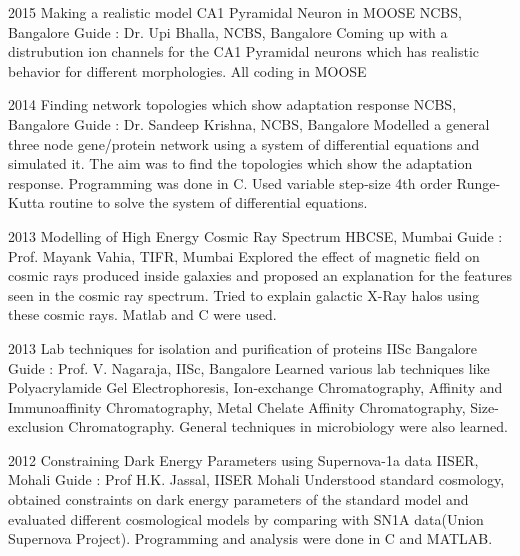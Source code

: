 \documentclass[11pt]{friggeri-cv}%
\begin{document}
\begin{entrylist}
  \entry
    {2015}
    {Making a realistic model CA1 Pyramidal Neuron in MOOSE}
    {NCBS, Bangalore}
    {Guide : Dr. Upi Bhalla, NCBS, Bangalore}
    {Coming up with a distrubution ion channels for the CA1 Pyramidal neurons which has realistic behavior for different morphologies. All coding in MOOSE}
\end{entrylist}
\begin{entrylist}
  \entry
    {2014}
    {Finding network topologies which show adaptation response}
    {NCBS, Bangalore}
    {Guide : Dr. Sandeep Krishna, NCBS, Bangalore}
    {Modelled a general three node gene/protein network using a system of differential equations and simulated it. The aim was to find the topologies which show the adaptation response. Programming was done in C. Used variable step-size 4th order Runge-Kutta routine to solve the system of differential equations.}
\end{entrylist}
\begin{entrylist}

  \entry
    {2013}
    {Modelling of High Energy Cosmic Ray Spectrum}
    {HBCSE, Mumbai}
    {Guide : Prof. Mayank Vahia, TIFR, Mumbai}
    {Explored the effect of magnetic field on cosmic rays produced inside galaxies and proposed an explanation for the features seen in the cosmic ray spectrum. Tried to explain galactic X-Ray halos using these cosmic rays. Matlab and C were used.
    }
\end{entrylist}
\begin{entrylist}
    
  \entry
    {2013}
    {Lab techniques for isolation and purification of proteins}
    {IISc Bangalore}
    {
    Guide : Prof. V. Nagaraja, IISc, Bangalore}
    {Learned various lab techniques like Polyacrylamide Gel Electrophoresis, Ion-exchange Chromatography, Affinity and Immunoaffinity Chromatography, Metal Chelate Affinity Chromatography,  Size-exclusion Chromatography. General techniques in microbiology were also learned.
    }    
\end{entrylist}
\begin{entrylist}

  \entry
    {2012}
    {Constraining Dark Energy Parameters using Supernova-1a data}
    {IISER, Mohali}
    {Guide : Prof H.K. Jassal, IISER Mohali}
    {Understood standard cosmology,  obtained constraints on dark energy parameters of the standard model and evaluated different cosmological models by comparing with SN1A data(Union Supernova Project). Programming and analysis were done in C and MATLAB.
    }
    
\end{entrylist}
\end{document}
